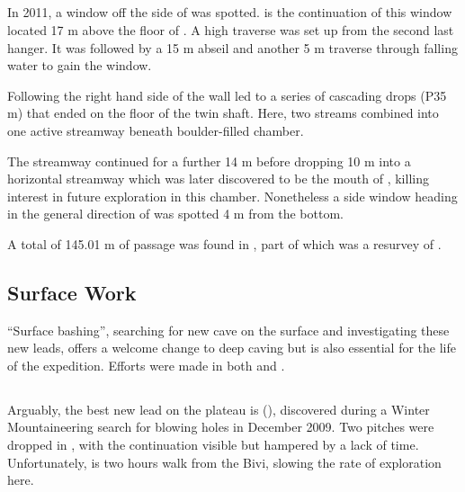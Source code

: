 \subsection{}

In 2011, a window off the side of  was
spotted.  is the continuation of this window located
17 m above the floor of . A high traverse was set up from the
second last hanger. It was followed by a 15 m abseil and another 5 m
traverse through falling water to gain the window.

Following the right hand side of the wall led to a series of cascading
drops (P35 m) that ended on the floor of the twin shaft. Here, two
streams combined into one active streamway beneath boulder-filled
chamber.

The streamway continued for a further 14 m before dropping 10 m into a
horizontal streamway which was later discovered to be the mouth of
, killing interest in future exploration in this
chamber. Nonetheless a side window heading in the general direction of
 was spotted 4 m from the bottom.

A total of 145.01 m of passage was found in , part of
which was a resurvey of .

\subsection{Surface Work}

“Surface bashing”, searching for new cave on the surface and investigating these new leads, offers a welcome change to deep caving but is also essential for the life of the expedition. Efforts were made in both  and .

\subsection{}

Arguably, the best new lead on the plateau is  (), discovered during a Winter Mountaineering search for blowing holes in December 2009. Two pitches were dropped in , with the continuation visible but hampered by a lack of time. Unfortunately,  is two hours walk from the Bivi, slowing the rate of exploration here.

